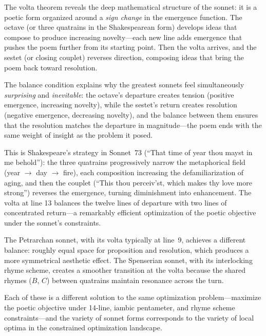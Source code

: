 \begin{interpretation}
\label{interp:sonnet}
The volta theorem reveals the deep mathematical structure of the sonnet: it is
a poetic form organized around a \emph{sign change} in the emergence function.
The octave (or three quatrains in the Shakespearean form) develops ideas that
compose to produce increasing novelty---each new line adds emergence that
pushes the poem further from its starting point.  Then the volta arrives, and
the sestet (or closing couplet) reverses direction, composing ideas that bring
the poem back toward resolution.

The balance condition explains why the greatest sonnets feel simultaneously
\emph{surprising} and \emph{inevitable}: the octave's departure creates
tension (positive emergence, increasing novelty), while the sestet's return
creates resolution (negative emergence, decreasing novelty), and the balance
between them ensures that the resolution matches the departure in magnitude---the
poem ends with the same weight of insight as the problem it posed.

This is Shakespeare's strategy in Sonnet~73 (``That time of year thou mayst in
me behold''): the three quatrains progressively narrow the metaphorical field
(year $\to$ day $\to$ fire), each composition increasing the defamiliarization
of aging, and then the couplet (``This thou perceiv'st, which makes thy love
more strong'') reverses the emergence, turning diminishment into enhancement.
The volta at line 13 balances the twelve lines of departure with two lines of
concentrated return---a remarkably efficient optimization of the poetic
objective under the sonnet's constraints.

The Petrarchan sonnet, with its volta typically at line~9, achieves a different
balance: roughly equal space for proposition and resolution, which produces a
more symmetrical aesthetic effect.  The Spenserian sonnet, with its interlocking
rhyme scheme, creates a smoother transition at the volta because the shared
rhymes ($B$, $C$) between quatrains maintain resonance across the turn.

Each of these is a different solution to the same optimization problem---maximize
the poetic objective under 14-line, iambic pentameter, and rhyme scheme
constraints---and the variety of sonnet forms corresponds to the variety of
local optima in the constrained optimization landscape.
\end{interpretation}


